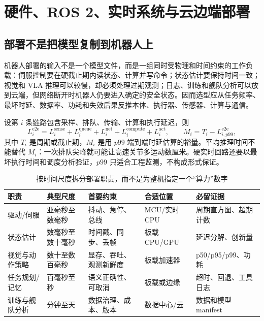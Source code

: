 \chapter{硬件、ROS 2、实时系统与云边端部署}
\label{chap:hardware-ros2-deployment}

\section{部署不是把模型复制到机器人上}

机器人部署的输入不是一个模型文件，而是一组同时受物理和时间约束的工作负载：伺服控制要在硬截止期内读状态、计算并写命令；状态估计要保持时间一致；视觉和 VLA 推理可以较慢，却必须处理过期观测；日志、训练和舰队分析可以放到云端，但网络断开时机器人仍要进入确定的安全状态。因而选型应从任务频率、最坏时延、数据率、功耗和失效后果反推本体、执行器、传感器、计算与通信。

设第 $i$ 条链路包含采样、排队、传输、计算和执行延迟，则
\begin{equation}
L_i^{\mathrm{e2e}}=L_i^{\mathrm{sense}}+L_i^{\mathrm{queue}}+
L_i^{\mathrm{net}}+L_i^{\mathrm{compute}}+L_i^{\mathrm{act}},
\qquad
M_i=T_i-L_{i,p99}^{\mathrm{e2e}},
\label{eq:deployment-latency-budget}
\end{equation}
其中 $T_i$ 是周期或截止期，$M_i$ 是用 $p99$ 端到端时延估算的裕量。平均推理时间不能替代 $M_i$：一次排队尖峰就可能让高速关节多运动数厘米。硬实时回路还要以最坏执行时间和调度分析验证，$p99$ 只适合工程监测，不构成形式保证。

\begin{table}[H]
\begingroup
{}
\centering
\caption{按时间尺度拆分部署职责，而不是为整机指定一个“算力”数字}
\label{tab:deployment-timescales}
\begin{tabularx}{\textwidth}{p{}p{}YYY}
\toprule
职责 & 典型尺度 & 首要约束 & 合适位置 & 必留证据 \\
\midrule
驱动/伺服 & 亚毫秒至数毫秒 & 抖动、急停、总线 & MCU/实时 CPU & 周期直方图、超期计数 \\
状态估计 & 数毫秒至数十毫秒 & 时间戳、同步、丢帧 & 板载 CPU/GPU & 延迟分解、创新量 \\
视觉与动作策略 & 数十至数百毫秒 & 显存、吞吐、观测新鲜度 & 板载加速器 & p50/p95/p99、功耗 \\
任务规划/记忆 & 百毫秒至秒 & 语义正确性、可取消 & 板载或边缘 & 超时、回退、工具日志 \\
训练与舰队分析 & 分钟至天 & 数据治理、成本、版本 & 数据中心/云 & 数据和模型 manifest \\
\bottomrule
\end{tabularx}
\endgroup
\end{table}


